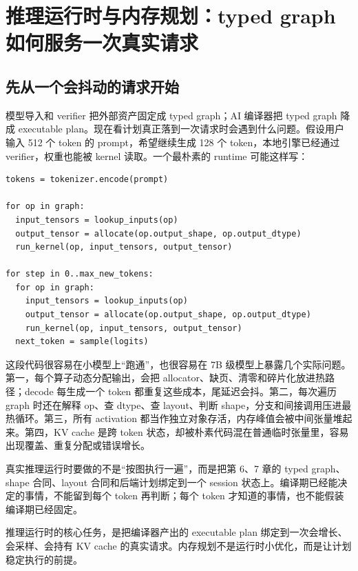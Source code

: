 \section{推理运行时与内存规划：typed graph 如何服务一次真实请求}

\subsection{先从一个会抖动的请求开始}

模型导入和 verifier 把外部资产固定成 typed graph；AI 编译器把 typed graph 降成 executable plan。现在看计划真正落到一次请求时会遇到什么问题。假设用户输入 512 个 token 的 prompt，希望继续生成 128 个 token，本地引擎已经通过 verifier，权重也能被 kernel 读取。一个最朴素的 runtime 可能这样写：

\begin{lstlisting}[numbers=none,caption={朴素 runtime 的热路径}]
tokens = tokenizer.encode(prompt)

for op in graph:
  input_tensors = lookup_inputs(op)
  output_tensor = allocate(op.output_shape, op.output_dtype)
  run_kernel(op, input_tensors, output_tensor)

for step in 0..max_new_tokens:
  for op in graph:
    input_tensors = lookup_inputs(op)
    output_tensor = allocate(op.output_shape, op.output_dtype)
    run_kernel(op, input_tensors, output_tensor)
  next_token = sample(logits)
\end{lstlisting}

这段代码很容易在小模型上“跑通”，也很容易在 7B 级模型上暴露几个实际问题。第一，每个算子动态分配输出，会把 allocator、缺页、清零和碎片化放进热路径；decode 每生成一个 token 都重复这些成本，尾延迟会抖。第二，每次遍历 graph 时还在解释 op、查 dtype、查 layout、判断 shape，分支和间接调用压进最热循环。第三，所有 activation 都当作独立对象存活，内存峰值会被中间张量堆起来。第四，KV cache 是跨 token 状态，却被朴素代码混在普通临时张量里，容易出现覆盖、重复分配或错误增长。

真实推理运行时要做的不是“按图执行一遍”，而是把第 6、7 章的 typed graph、shape 合同、layout 合同和后端计划绑定到一个 session 状态上。编译期已经能决定的事情，不能留到每个 token 再判断；每个 token 才知道的事情，也不能假装编译期已经固定。

\begin{keyidea}
推理运行时的核心任务，是把编译器产出的 executable plan 绑定到一次会增长、会采样、会持有 KV cache 的真实请求。内存规划不是运行时小优化，而是让计划稳定执行的前提。
\end{keyidea}

